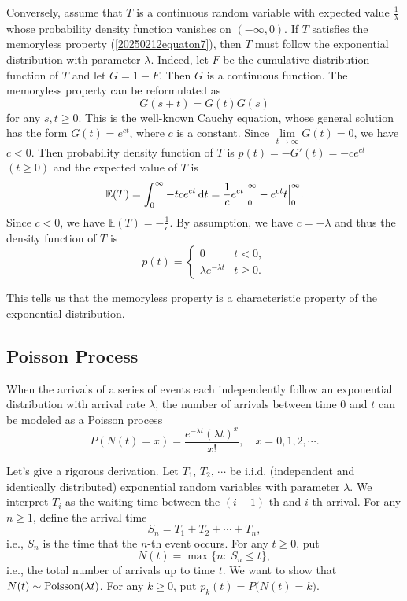 \documentclass[12pt,letterpaper, onecolumn]{exam}
\begin{document}
Conversely, assume that $T$ is a continuous random variable with expected value $\frac{1}{\lambda}$ whose probability density function vanishes on $(-\infty,0)$. If $T$ satisfies the memoryless property (\ref{20250212equaton7}), then $T$ must follow the exponential distribution with parameter $\lambda$. Indeed, let $F$ be the cumulative distribution function of $T$ and let $G=1-F$. Then $G$ is a continuous function. The memoryless property can be reformulated as
$$G(s+t)=G(t)G(s)$$
for any $s,t\ge 0$. This is the well-known Cauchy equation, whose general solution has the form $G(t)=e^{ct}$, where $c$ is a constant. Since $\lim\limits_{t\rightarrow\infty}G(t)=0$, we have $c<0$. Then probability density function of $T$ is $p(t)=-G'(t)=-ce^{ct}$ $(t\ge 0)$ and the expected value of $T$ is 
$$\mathbb{E}(T)=\int_0^{\infty}-tce^{ct}\,{\rm{d}}t=\frac{1}{c}e^{ct}\Big|_0^{\infty}-e^{ct}t\Big|_{0}^{\infty}.$$
Since $c<0$, we have $\mathbb{E}(T)=-\frac{1}{c}$. By assumption, we have $c=-\lambda$ and thus the density function of $T$ is 
$$p(t)=\begin{cases}
    0&t<0,\\
    \lambda e^{-\lambda t}&t\ge 0.
\end{cases}$$

This tells us that the memoryless property is a characteristic property of the exponential distribution.


\subsection{Poisson Process}

\quad When the arrivals of a series of events each independently follow an exponential distribution with arrival rate $\lambda$, the number of arrivals between time $0$ and $t$ can be modeled as a Poisson process 
$$P(N(t)=x)=\frac{e^{-\lambda t}(\lambda t)^x}{x!},\quad x=0,1,2,\cdots.$$

Let's give a rigorous derivation. Let $T_1$, $T_2$, $\cdots$ be i.i.d. (independent and identically distributed) exponential random variables with parameter $\lambda$. We interpret $T_i$ as the waiting time between the $(i-1)$-th and $i$-th arrival. For any $n\ge 1$, define the arrival time
$$S_n=T_1+T_2+\cdots+T_n,$$
i.e., $S_n$ is the time that the $n$-th event occurs. For any $t\ge 0$, put 
$$N(t)=\max\{n:\ S_n\le t\},$$
i.e., the total number of arrivals up to time $t$. We want to show that $N(t)\sim{\rm{Poisson}}(\lambda t)$. For any $k\ge 0$, put $p_k(t)=P\big(N(t)=k\big)$.
\end{document}
